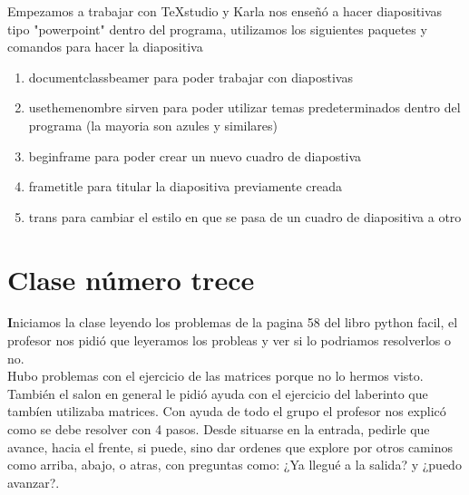 \documentclass{book}
\begin{document}
\begin{enumerate}
\begin{enumerate}
Empezamos a trabajar con TeXstudio y Karla nos enseñó a hacer diapositivas tipo "powerpoint" dentro del programa, utilizamos los siguientes paquetes y comandos para hacer la diapositiva
\begin{enumerate}
	\item \color{green} documentclass{beamer} \color{orange} para poder trabajar con diapostivas \color{black}
	\item \color{green} usetheme{nombre} \color{orange} sirven para poder utilizar temas predeterminados dentro del programa (la mayoria son azules y similares) \color{black}
	\item \color{green} begin{frame} \color{orange} para poder crear un nuevo cuadro de diapostiva \color{black}
	\item \color{green} frametitle \color{orange} para titular la diapositiva previamente creada \color{black}
	\item \color{green} trans \color{orange} para cambiar el estilo en que se pasa de un cuadro de diapositiva a otro \color{black}
\end{enumerate}

\chapter{Clase número trece}
\textbf Iniciamos la clase leyendo los problemas de la pagina 58 del libro python facil, el profesor nos pidió que leyeramos los probleas y ver si lo podriamos resolverlos o no.\\
Hubo problemas con el ejercicio de las matrices porque no lo hermos visto.\\ 
También el salon en general le pidió ayuda con el ejercicio del laberinto que tambíen utilizaba matrices. Con ayuda de todo el grupo el profesor nos explicó como se debe resolver con 4 pasos. Desde situarse en la entrada, pedirle que avance, hacia el frente, si puede, sino dar ordenes que explore por otros caminos como arriba, abajo, o atras, con preguntas como: ¿Ya llegué a la salida? y ¿puedo avanzar?.\\


\end{enumerate}
\end{enumerate}
\end{document}
